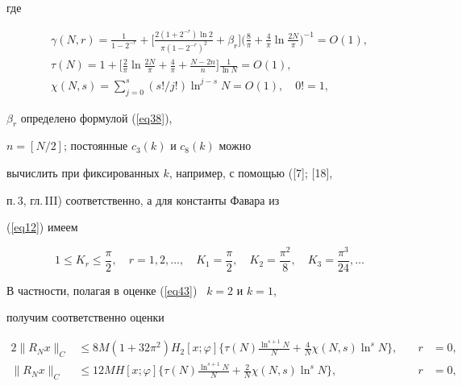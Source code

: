 где


\begin{gather}\label{eq44}


\gamma(N,r) = \frac{1}{1-2^{-r}} +


\bigg[\frac{2(1+2^{-r})\ln2}{\pi(1-2^{-r})^2}


+ \beta_r\bigg]\bigg(\frac{8}{\pi} +


\frac{4}{\pi}\ln\frac{2N}{\pi}\bigg)^{-1} = O(1), \\


%


\label{eq45}


\tau(N) = 1 + \bigg[\frac{2}{\pi}\ln\frac{2N}{\pi} +


\frac{4}{\pi} + \frac{N-2n}{n}\bigg]\frac{1}{\ln N} =O(1), \\


%


\label{eq46}


\chi(N,s) = \sum_{j=0}^s (s!/j!)\ln^{j-s}N =


O(1),\quad 0! = 1,


\end{gather}


$\beta_r$ определено формулой (\ref{eq38}),


$n=[N/2]$; постоянные $c_3(k)$ и $c_8(k)$ можно


вычислить при фиксированных $k$, например, с помощью ([7]; [18],


п.\,3, гл.\,III) соответственно, а для константы Фавара из


(\ref{eq12}) имеем


$$


1\leq K_r\leq\frac{\pi}{2},\quad r = 1,2,\dotsc, \quad K_1=\frac{\pi}{2},


\quad K_2 = \frac{\pi^2}{8}, \quad K_3 =


\frac{\pi^3}{24},\dotsc


$$





В частности, полагая в оценке (\ref{eq43}) \ $k=2$ и $k=1$,


получим соответственно оценки


\begin{alignat*}{2}


\|R_Nx\|_C&\leq8M(1+32\pi^2)


H_2[x;\varphi] \bigg\{\tau(N)


\frac{\ln^{s+1}N}{N} + \frac{4}{N}\chi(N,s) \ln^sN


\bigg\},&\quad r&=0,\\


%


\|R_Nx\|_C&\leq12M H [x;\varphi] \bigg\{\tau(N)


\frac{\ln^{s+1}N}{N} + \frac{2}{N}\chi(N,s) \ln^sN


\bigg\},&\quad r&=0,


\end{alignat*}


